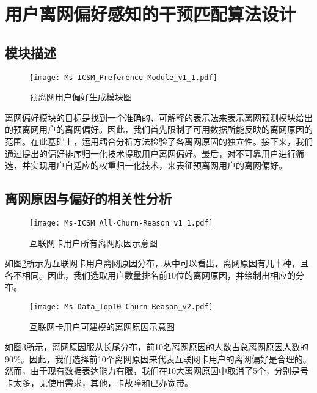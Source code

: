 \newpage

\section{用户离网偏好感知的干预匹配算法设计}
\subsection{模块描述}
\begin{figure}[hbt]
	\centering
	\texttt{[image: Ms-ICSM\_Preference-Module\_v1\_1.pdf]}
	\caption{预离网用户偏好生成模块图}
	\label{Fig:Preference-Module}
\end{figure}

离网偏好模块的目标是找到一个准确的、可解释的表示法来表示离网预测模块给出的预离网用户的离网偏好。因此，我们首先限制了可用数据所能反映的离网原因的范围。在此基础上，运用耦合分析方法检验了各离网原因的独立性。接下来，我们通过提出的偏好排序归一化技术提取用户离网偏好。最后，对不可靠用户进行筛选，并实现用户自适应的权重归一化技术，来表征预离网用户的离网偏好。


\subsection{离网原因与偏好的相关性分析}
\begin{figure}[hbt]
	\centering
	\texttt{[image: Ms-ICSM\_All-Churn-Reason\_v1\_1.pdf]}
	\caption{互联网卡用户所有离网原因示意图}
	\label{Fig:All-Churn-Reason}
\end{figure}
如图\ref{Fig:All-Churn-Reason}所示为互联网卡用户离网原因分布，从中可以看出，离网原因有几十种，且各不相同。因此，我们选取用户数量排名前10位的离网原因，并绘制出相应的分布。

\begin{figure}[hbt]
	\centering
	\texttt{[image: Ms-Data\_Top10-Churn-Reason\_v2.pdf]}
	\caption{互联网卡用户可建模的离网原因示意图}
	\label{Fig:ICSM-Top10-Churn-Reason}
\end{figure}
如图\ref{Fig:ICSM-Top10-Churn-Reason}所示，离网原因服从长尾分布，前10名离网原因的人数占总离网原因人数的90\%。因此，我们选择前10个离网原因来代表互联网卡用户的离网偏好是合理的。然而，由于现有数据表达能力有限，我们在10大离网原因中取消了5个，分别是号卡太多，无使用需求，其他，卡故障和已办宽带。



